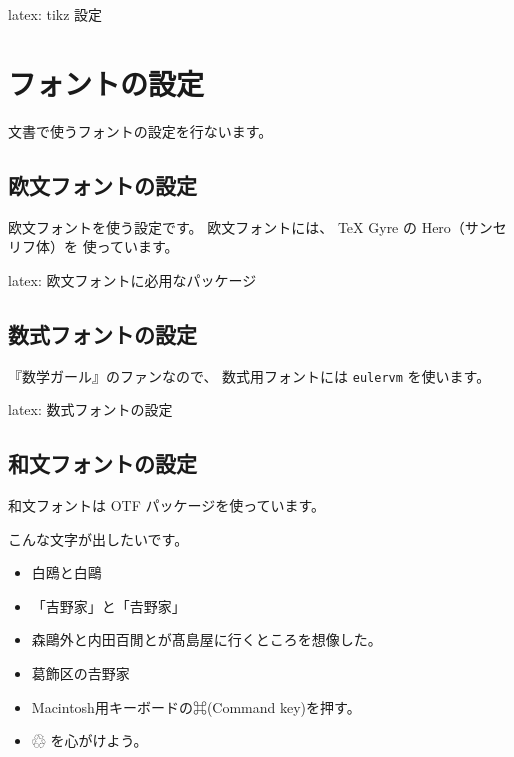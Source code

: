 \documentclass[dvipdfmx,a4j,14pt,uplatex,openany]{jsbook}
\begin{document}
\begin{programlist}[label={org2702d5d}]{latex}{: tikz 設定}%
\usepackage{tikz}
\usetikzlibrary{shadings,shadows}
\usetikzlibrary{decorations.pathmorphing}
\usetikzlibrary{patterns}
\usetikzlibrary{spy}
\usetikzlibrary{arrows.meta}
\end{programlist}

\section{フォントの設定}
\label{sec:org1aee007}
文書で使うフォントの設定を行ないます。

\subsection{欧文フォントの設定}
\label{sec:org985af1e}
欧文フォントを使う設定です。
欧文フォントには、 \TeX{} Gyre の Hero（サンセリフ体）を
使っています。

\begin{programlist}[label={orga6c8eca}]{latex}{: 欧文フォントに必用なパッケージ}\usepackage[T1]{fontenc}
\usepackage{textcomp}
\usepackage[lmr]{mathcomp}
\usepackage[utf8]{inputenc}
\usepackage{tgheros}
\usepackage{tgcursor}
\renewcommand{\familydefault}{\sfdefault} %
\end{programlist}

\subsection{数式フォントの設定}
\label{sec:orgefb6971}
『数学ガール』のファンなので、
数式用フォントには \texttt{eulervm} を使います。

\begin{programlist}[label={orgc687366}]{latex}{: 数式フォントの設定}%
\usepackage{ccfonts}
\usepackage{eulervm}
\end{programlist}

\subsection{和文フォントの設定}
\label{sec:orgece0abb}
和文フォントは OTF パッケージを使っています。

こんな文字が出したいです。

\begin{itemize}
\item 白鴎と白鷗
\item 「吉野家」と「𠮷野家」
\item 森鷗外と内田百閒とが髙島屋に行くところを想像した。
\item 葛飾区の𠮷野家
\item Macintosh用キーボードの⌘(Command key)を押す。
\item ♲ を心がけよう。
\end{itemize}
\end{document}
